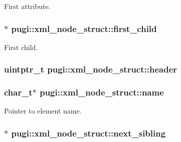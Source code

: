 First attribute. 

\hypertarget{structpugi_1_1xml__node__struct_af72c49a0f81928ef664d9d2f0260f23d}{
\subsubsection[{first\-\_\-child}]{$\ast$ pugi\-::xml\-\_\-node\-\_\-struct\-::first\-\_\-child}}\label{structpugi_1_1xml__node__struct_af72c49a0f81928ef664d9d2f0260f23d}


First child. 

\hypertarget{structpugi_1_1xml__node__struct_aea2e405a368dc5a278a2d23465f1975c}{
\subsubsection[{header}]{\setlength{\rightskip}{0pt plus 5cm}uintptr\-\_\-t pugi\-::xml\-\_\-node\-\_\-struct\-::header}}\label{structpugi_1_1xml__node__struct_aea2e405a368dc5a278a2d23465f1975c}
\hypertarget{structpugi_1_1xml__node__struct_ae2324fdbd1e307fb12007d1d0f957a0b}{
\subsubsection[{name}]{\setlength{\rightskip}{0pt plus 5cm}char\-\_\-t$\ast$ pugi\-::xml\-\_\-node\-\_\-struct\-::name}}\label{structpugi_1_1xml__node__struct_ae2324fdbd1e307fb12007d1d0f957a0b}


Pointer to element name. 

\hypertarget{structpugi_1_1xml__node__struct_acf0867e3a77871e37132046d97398a6d}{
\subsubsection[{next\-\_\-sibling}]{$\ast$ pugi\-::xml\-\_\-node\-\_\-struct\-::next\-\_\-sibling}}\label{structpugi_1_1xml__node__struct_acf0867e3a77871e37132046d97398a6d}



